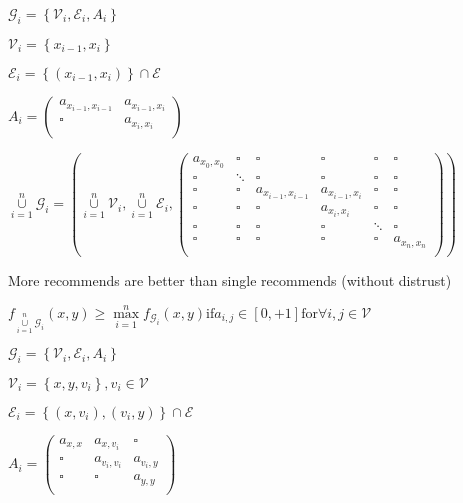 \documentclass{article}
\begin{document}
\(\mathcal{G}_i=\left\{\mathcal{V}_i,\mathcal{E}_i,A_i\right\}\)

\(\mathcal{V}_i=\left\{x_{i-1},x_i\right\}\)

\(\mathcal{E}_i=\left\{\left(x_{i-1},x_i\right)\right\}\cap \mathcal{E}\)

\(A_i=\left(
\begin{array}{cc}
 a_{x_{i-1},x_{i-1}} & a_{x_{i-1},x_i} \\
 \square  & a_{x_i,x_i} \\
\end{array}
\right)\)

\(\underset{i=1}{\overset{n}{\cup }}\mathcal{G}_i=\left(\underset{i=1}{\overset{n}{\cup }}\mathcal{V}_i,\underset{i=1}{\overset{n}{\cup }}\mathcal{E}_i,\left(
\begin{array}{cccccc}
 a_{x_0,x_0} & \square  & \square  & \square  & \square  & \square  \\
 \square  & \ddots & \square  & \square  & \square  & \square  \\
 \square  & \square  & a_{x_{i-1},x_{i-1}} & a_{x_{i-1},x_i} & \square  & \square  \\
 \square  & \square  & \square  & a_{x_i,x_i} & \square  & \square  \\
 \square  & \square  & \square  & \square  & \ddots & \square  \\
 \square  & \square  & \square  & \square  & \square  & a_{x_n,x_n} \\
\end{array}
\right)\right)\)

More recommends are better than single recommends (without distrust)

\(f_{\underset{i=1}{\overset{n}{\cup }}\mathcal{G}_i}(x,y)\geq \underset{i=1}{\overset{n}{\max }}f_{\mathcal{G}_i}(x,y) \text{if} a_{i,j}\in [0,+1]
\text{for} \forall i,j\in \mathcal{V}\)

\(\mathcal{G}_i=\left\{\mathcal{V}_i,\mathcal{E}_i,A_i\right\}\)

\(\mathcal{V}_i=\left\{x,y,v_i\right\},v_i\in \mathcal{V}\)

\(\mathcal{E}_i=\left\{\left(x,v_i\right),\left(v_i,y\right)\right\}\cap \mathcal{E}\)

\(A_i=\left(
\begin{array}{ccc}
 a_{x,x} & a_{x,v_i} & \square  \\
 \square  & a_{v_i,v_i} & a_{v_i,y} \\
 \square  & \square  & a_{y,y} \\
\end{array}
\right)\)
\end{document}
